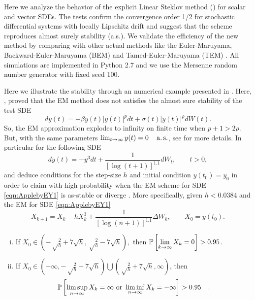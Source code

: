 Here we analyze the behavior of the explicit Linear Steklov method (\SM) for scalar and vector SDEs. 
The tests confirm the convergence order 1/2 for stochastic differential systems with locally Lipschitz drift 
and suggest that the \SM scheme reproduces almost surely stability (a.s.). We validate the efficiency of the new 
method  by comparing with other actual methods like the Euler-Maruyama, Backward-Euler-Maruyama (BEM) \cite{Mao2013} 
and Tamed-Euler-Maruyama (TEM) \cite{Hutzenthaler2012a}. All simulations are implemented in Python 2.7 and we use the 
Mersenne random number generator with fixed seed 100.
	
\begin{example}

		Here we illustrate the stability  through an numerical example presented in 
	\cite[sec 7, pg. 420]{Appleby2010}. Here, \citeauthor{Appleby2010}, proved that the EM method does not satisfies 
	the almost sure stability of the test SDE
	\begin{equation}
	dy(t)= -\beta y(t)|y(t)|^p dt +\sigma(t)|y(t)|^ {\rho} dW(t).
	\end{equation}
	So, the EM approximation explodes to infinity on finite time when $p+1>2\rho$. But, with the same parameters
	$
	\lim_{t \to \infty} y(t)=0 \quad \operatorname*{a.s.}
	$, see \cite{Appleby2008, Appleby2010} for more details.
	In particular for  the following SDE 
	\begin{equation}\label{eqn:ApplebyEY1}
		dy(t) = -y^3 dt 
		+ \frac{1}{\left[\log(t+1)\right]^{1.1}} dW_t, \qquad t>0,
	\end{equation}
	and deduce conditions for the step-size $h$ and initial condition $y(t_0)=y_0$ in order to claim with high 
	probability
	when the EM scheme for SDE \eqref{eqn:ApplebyEY1} is as-stable or diverge \cite[Cor 7.1 pg. 421]{Appleby2010}. 
	More specifically, given $h<\num{0.0384}$ and  the EM for SDE \eqref{eqn:ApplebyEY1}
	\begin{equation}\label{eqn:EMRecurrenceApplbyEY1}
		X_{k+1} = X_k -h X_k^3 
		+\frac{1}{[\log(n+1)]^{1.1}} \Delta W_k, \qquad X_0=y(t_0).
	\end{equation}
	\begin{enumerate}[(i)]
		\item
		If $
		\displaystyle
		X_0\in \left(
		-\sqrt\frac{2}{h} + 7 \sqrt h,
		\sqrt\frac{2}{h} - 7 \sqrt h
		\right),
		$
		then
		$
		\displaystyle
		\mathbb{P}\left[
			\lim_{k\to\infty}
			X_k = 0
		\right]>0.95
		$\quad.
		\item  
		If 
		$
		\displaystyle
		X_0\in \left(
		-\infty,
		-\sqrt\frac{2}{h} - 7 \sqrt h
		\right)
		\bigcup
		\left(
		\sqrt\frac{2}{h} + 7 \sqrt h,
		\infty
		\right)
		$,
		then 
		$$
		\displaystyle
		\mathbb{P}\left[
			\limsup_{n\to\infty}
			X_k = \infty
			\text{ or }
			\liminf_{n\to\infty}
			X_k = -\infty
		\right]>0.95 \quad.
		$$
		

\end{enumerate}
\end{example}
